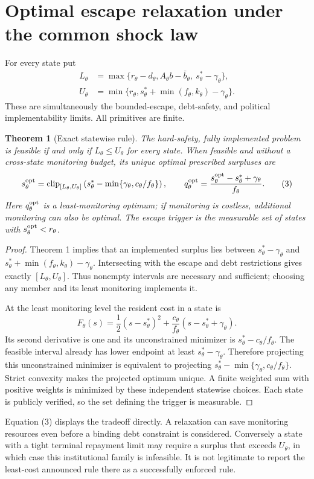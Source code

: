 \documentclass[11pt]{article}
\newtheorem{theorem}{Theorem}
\theoremstyle{remark}
\newcommand{\clip}{\operatorname{clip}}
\begin{document}
\section{Optimal escape relaxation under the common shock law}
For every state put
\begin{align*}
 L_\theta&=\max\{r_\theta-d_\theta,
 A_\theta b-\bar b_\theta,\ s_\theta^*-\gamma_\theta\},\\
 U_\theta&=\min\{r_\theta,
 s_\theta^*+\min(f_\theta,k_\theta)-\gamma_\theta\}.
\end{align*}
These are simultaneously the bounded-escape, debt-safety, and political
implementability limits. All primitives are finite.

\begin{theorem}[Exact statewise rule]
The hard-safety, fully implemented problem is feasible if and only if
$L_\theta\leq U_\theta$ for every state. When feasible and without a
cross-state monitoring budget, its unique optimal prescribed surpluses are
\[
 s_\theta^{\rm opt}=\clip_{[L_\theta,U_\theta]}
 \left(s_\theta^*-
       \min\{\gamma_\theta,c_\theta/f_\theta\}\right),\qquad
 q_\theta^{\rm opt}
   =\frac{s_\theta^{\rm opt}-s_\theta^*+\gamma_\theta}{f_\theta}.
 \tag{3}
\]
Here $q_\theta^{\rm opt}$ is a least-monitoring optimum; if monitoring is
costless, additional monitoring can also be optimal. The escape trigger is
the measurable set of states with $s_\theta^{\rm opt}<r_\theta$.
\end{theorem}
\begin{proof}
Theorem 1 implies that an implemented surplus lies between
$s_\theta^*-\gamma_\theta$ and
$s_\theta^*+\min(f_\theta,k_\theta)-\gamma_\theta$.
Intersecting with the escape and debt restrictions gives exactly
$[L_\theta,U_\theta]$. Thus nonempty intervals are necessary and
sufficient; choosing any member and its least monitoring implements it.

At the least monitoring level the resident cost in a state is
\[
 F_\theta(s)=\frac12(s-s_\theta^*)^2+
 \frac{c_\theta}{f_\theta}(s-s_\theta^*+\gamma_\theta). \tag{4}
\]
Its second derivative is one and its unconstrained minimizer is
$s_\theta^*-c_\theta/f_\theta$. The feasible interval already has
lower endpoint at least $s_\theta^*-\gamma_\theta$. Therefore projecting
this unconstrained minimizer is equivalent to projecting
$s_\theta^*-\min\{\gamma_\theta,c_\theta/f_\theta\}$.
Strict convexity makes the projected optimum unique. A finite weighted
sum with positive weights is minimized by these independent statewise
choices. Each state is publicly verified, so the set defining the trigger
is measurable.
\end{proof}
Equation (3) displays the tradeoff directly. A relaxation can save
monitoring resources even before a binding debt constraint is considered.
Conversely a state with a tight terminal repayment limit may require a
surplus that exceeds $U_\theta$, in which case this institutional family is
infeasible. It is not legitimate to report the least-cost announced rule
there as a successfully enforced rule.
\end{document}
